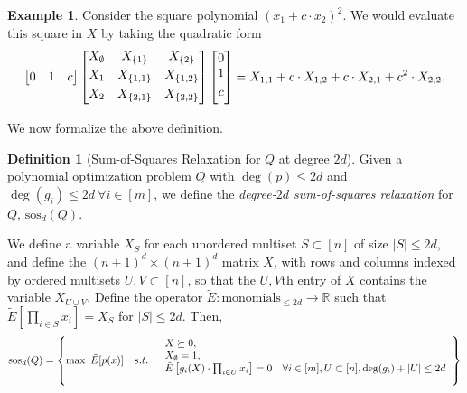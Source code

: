 \documentclass[a4paper,11pt]{article}
\newcommand{\R}{\mathbb{R}}
\newcommand{\sos}{\mathrm{sos}}
\theoremstyle{definition}
\newtheorem{example}{Example}
\newtheorem{definition}{Definition}
\begin{document}
\begin{example}
Consider the square polynomial $(x_1 + c \cdot x_2)^2$.
We would evaluate this square in $X$ by taking the quadratic form 
\[
\begin{bmatrix}
0 & 1 & c
\end{bmatrix}
\begin{bmatrix}
\vspace{1mm}
 X_{\emptyset} & X_{\{1\}} & X_{\{2\}} \\
\vspace{1mm}
 X_{1} & X_{\{1,1\}} & X_{\{1,2\}} \\
\vspace{1mm}
 X_{2} & X_{\{2,1\}} & X_{\{2,2\}}\\ 
\end{bmatrix}
\begin{bmatrix}
0\\
\vspace{1mm}
1 \\ 
\vspace{1mm}
c
\end{bmatrix}
= X_{1,1} + c\cdot X_{1,2} + c\cdot X_{2,1} + c^2 \cdot X_{2,2}. 
\]
\end{example}

\medskip
We now formalize the above definition.
\begin{definition}[Sum-of-Squares Relaxation for $Q$ at degree $2d$]
Given a polynomial optimization problem $Q$ with $\deg(p)\le 2d$ and $\deg(g_i) \le 2d\ \forall i \in [m]$, we define the {\em degree-$2d$ sum-of-squares relaxation} for $Q$, $\sos_{d}(Q)$.

We define a variable $X_{S}$ for each unordered multiset $S \subset [n]$ of size $|S| \le 2d$, and define the $(n+1)^d \times (n+1)^d$ matrix $X$, with rows and columns indexed by ordered multisets $U,V \subset [n]$, so that the $U,V$th entry of $X$ contains the variable $X_{U\cup V}$.
Define the operator $\tilde{E}:\text{monomials}_{\le 2d}\to \R$ such that $\tilde{E}[\prod_{i\in S} x_i] = X_S$ for $|S| \le 2d$.
Then,
\[
\sos_d(Q) = 
\left\{
\max \ \tilde{E}[p(x)] \quad s.t.\quad
\begin{blockarray}{l}
 X \succeq 0,&\\ 
X_{\emptyset} = 1,& \\
\tilde{E}\left[ g_i(X)\cdot\prod_{i\in U} x_i\right] = 0\quad  \forall i \in [m], U \subset [n], \deg(g_i) + |U| \le 2d&
\end{blockarray}
\right\}
\]
\end{definition}
\end{document}
